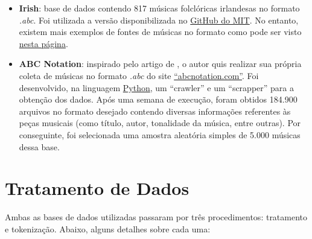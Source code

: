 \documentclass{automatextcc}
\begin{document}
\begin{itemize}
    \item \textbf{Irish}: base de dados contendo 817 músicas folclóricas irlandesas no formato \textit{.abc}. Foi utilizada a versão disponibilizada no \href{https://github.com/aamini/introtodeeplearning/blob/master/mitdeeplearning/data/irish.abc}{GitHub do MIT}. No entanto, existem mais exemplos de fontes de músicas no formato como pode ser visto \href{https://www.norbeck.nu/abc/links.asp}{nesta página}. 
    \item \textbf{ABC Notation}: inspirado pelo artigo de \citet{agarwala2017}, o autor quis realizar sua própria coleta de músicas no formato \textit{.abc} do site \href{https://abcnotation.com/}{``abcnotation.com''}. Foi desenvolvido, na linguagem \href{https://python.org/}{Python}, um ``crawler'' e um ``scrapper'' para a obtenção dos dados. Após uma semana de execução, foram obtidos 184.900 arquivos no formato desejado contendo diversas informações referentes às peças musicais (como título, autor, tonalidade da música, entre outras). Por conseguinte, foi selecionada uma amostra aleatória simples de 5.000 músicas dessa base.
\end{itemize}




\section{Tratamento de Dados}



Ambas as bases de dados utilizadas passaram por três procedimentos: tratamento e tokenização. Abaixo, alguns detalhes sobre cada uma:
\end{document}
